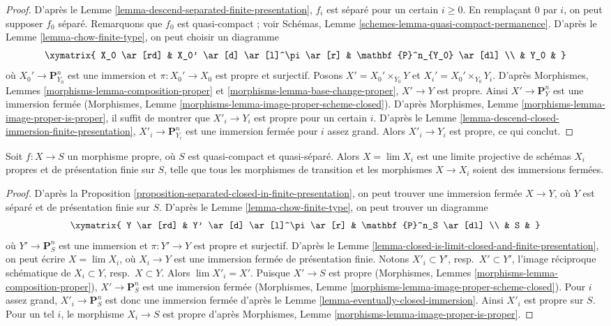 \begin{proof}
D'après le Lemme \ref{lemma-descend-separated-finite-presentation},
$f_i$ est séparé pour un certain $i \geq 0$. En remplaçant
$0$ par $i$, on peut supposer $f_0$ séparé.
Remarquons que $f_0$ est quasi-compact ; voir
Schémas, Lemme \ref{schemes-lemma-quasi-compact-permanence}.
D'après le Lemme \ref{lemma-chow-finite-type}, on peut choisir un diagramme
$$
\xymatrix{
X_0 \ar[rd] & X_0' \ar[d] \ar[l]^\pi \ar[r] & \mathbf{P}^n_{Y_0} \ar[dl] \\
& Y_0 &
}
$$
où $X_0' \to \mathbf{P}^n_{Y_0}$ est une immersion et
$\pi : X_0' \to X_0$ est propre et surjectif. Posons
$X' = X_0' \times_{Y_0} Y$ et $X_i' = X_0' \times_{Y_0} Y_i$.
D'après Morphismes, Lemmes \ref{morphisms-lemma-composition-proper} et
\ref{morphisms-lemma-base-change-proper},
$X' \to Y$ est propre. Ainsi $X' \to \mathbf{P}^n_Y$ est
une immersion fermée (Morphismes, Lemme
\ref{morphisms-lemma-image-proper-scheme-closed}). D'après
Morphismes, Lemme \ref{morphisms-lemma-image-proper-is-proper},
il suffit de montrer que $X'_i \to Y_i$ est propre pour un certain $i$.
D'après le Lemme \ref{lemma-descend-closed-immersion-finite-presentation},
$X'_i \to \mathbf{P}^n_{Y_i}$ est
une immersion fermée pour $i$ assez grand. Alors $X'_i \to Y_i$
est propre, ce qui conclut.
\end{proof}

\begin{lemma}
\label{lemma-proper-limit-of-proper-finite-presentation}
Soit $f : X \to S$ un morphisme propre, où $S$ est quasi-compact et
quasi-séparé. Alors $X = \lim X_i$ est une limite projective de schémas
$X_i$ propres et de présentation finie sur $S$, telle que
tous les morphismes de transition et les morphismes $X \to X_i$ soient des immersions
fermées.
\end{lemma}

\begin{proof}
D'après la Proposition \ref{proposition-separated-closed-in-finite-presentation},
on peut trouver une immersion fermée $X \to Y$, où $Y$ est séparé et de
présentation finie sur $S$. D'après le Lemme \ref{lemma-chow-finite-type},
on peut trouver un diagramme
$$
\xymatrix{
Y \ar[rd] & Y' \ar[d] \ar[l]^\pi \ar[r] & \mathbf{P}^n_S \ar[dl] \\
& S &
}
$$
où $Y' \to \mathbf{P}^n_S$ est une immersion et
$\pi : Y' \to Y$ est propre et surjectif. D'après le
Lemme \ref{lemma-closed-is-limit-closed-and-finite-presentation},
on peut écrire $X = \lim X_i$, où $X_i \to Y$ est une immersion fermée de
présentation finie. Notons $X'_i \subset Y'$, resp.\ $X' \subset Y'$,
l'image réciproque schématique de $X_i \subset Y$, resp.\ $X \subset Y$.
Alors $\lim X'_i = X'$. Puisque $X' \to S$ est propre
(Morphismes, Lemmes \ref{morphisms-lemma-composition-proper}),
$X' \to \mathbf{P}^n_S$ est une immersion fermée (Morphismes, Lemme
\ref{morphisms-lemma-image-proper-scheme-closed}). Pour $i$ assez grand,
$X'_i \to \mathbf{P}^n_S$ est donc une immersion fermée d'après le
Lemme \ref{lemma-eventually-closed-immersion}.
Ainsi $X'_i$ est propre sur $S$.
Pour un tel $i$, le morphisme $X_i \to S$ est propre d'après
Morphismes, Lemme \ref{morphisms-lemma-image-proper-is-proper}.
\end{proof}


